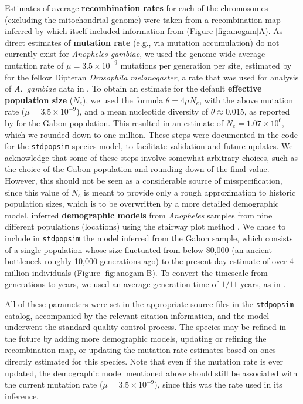 \documentclass[hidelinks]{article}
\newcommand{\stdpopsim}{\texttt{stdpopsim}\xspace}
\begin{document}
Estimates of average \textbf{recombination rates} for each of the chromosomes (excluding the mitochondrial genome)
were taken from a recombination map inferred by \citet{Pombi2006} which itself included information from
\citet{zheng1996integrated} (Figure \ref{fig:anogam}A).
As direct estimates of \textbf{mutation rate} (e.g., via mutation accumulation) do not currently exist for \emph{Anopheles gambiae},
we used the genome-wide average mutation rate of $\mu=3.5 \times 10^{-9}$ mutations per generation per site,
estimated by \cite{Keightley2009} for the fellow Dipteran \textit{Drosophila melanogaster},
a rate that was used for analysis of \textit{A.~gambiae} data in \citet{Miles2017}.
To obtain an estimate for the default \textbf{effective population size} ($N_e$),
we used the formula $\theta=4\mu N_e$,
with the above mutation rate ($\mu=3.5 \times 10^{-9}$),
and a mean nucleotide diversity of $\theta\approx 0.015$,
as reported by \citet{Miles2017} for the Gabon population.
This resulted in an estimate of $N_e=1.07\times 10^{6}$,
which we rounded down to one million. 
These steps were documented in the code for the \stdpopsim species model,
to facilitate validation and future updates.
We acknowledge that some of these steps involve somewhat arbitrary choices,
such as the choice of the Gabon population and rounding down of the final value.
However, this should not be seen as a considerable source of misspecification,
since this value of $N_e$ is meant to provide only a rough approximation to
historic population sizes, which is to be overwritten by a more detailed demographic model.
\citet{Miles2017} inferred \textbf{demographic models} from \textit{Anopheles} samples from nine different populations (locations) using the stairway plot method \citep{Liu2015}.
We chose to include in \stdpopsim the model inferred from the Gabon sample, 
which consists of a single population whose size fluctuated from below 80,000
(an ancient bottleneck roughly 10,000 generations ago) to the present-day estimate of over 4 million individuals (Figure \ref{fig:anogam}B).
To convert the timescale from generations to years,
we used an average generation time of $1/11$ years,
as in \cite{Miles2017}.


All of these parameters were set in the appropriate source files in the \stdpopsim catalog,
accompanied by the relevant citation information,
and the model underwent the standard quality control process.
The species may be refined in the future by adding more demographic models,
updating or refining the recombination map,
or updating the mutation rate estimates based on ones directly estimated for this species.
Note that even if the mutation rate is ever updated,
the demographic model mentioned above should still be associated with the current
mutation rate ($\mu=3.5 \times 10^{-9}$),
since this was the rate used in its inference.
\end{document}
